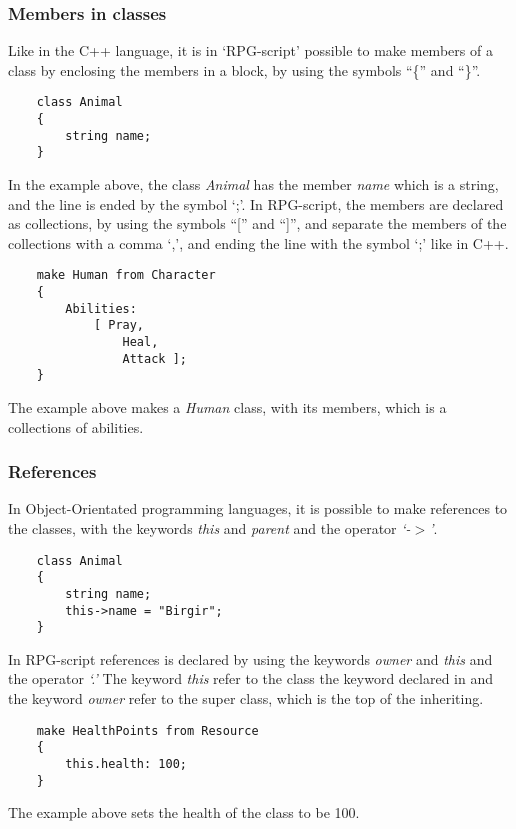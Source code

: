\subsubsection*{Members in classes}
Like in the C++ language, it is in `RPG-script' possible to make members of a class by enclosing the members in a block, by using the symbols ``\{'' and ``\}''.
\begin{lstlisting}
	class Animal
	{
		string name;
	}
\end{lstlisting}
In the example above, the class \emph{Animal} has the member \emph{name} which is a string, and the line is ended by the symbol `;'.
In RPG-script, the members are declared as collections, by using the symbols ``['' and ``]'', and separate the members of the collections with a comma `,', and ending the line with the symbol `;' like in C++.
\begin{lstlisting}
	make Human from Character
	{	
		Abilities:
			[ Pray, 
				Heal,
				Attack ];
	}
\end{lstlisting}
The example above makes a \emph{Human} class, with its members, which is a collections of abilities.

\subsubsection*{References}
In Object-Orientated programming languages, it is possible to make references to the classes, with the keywords \emph{this} and \emph{parent} and the operator \emph{`-$>$'}.
\begin{lstlisting}
	class Animal
	{
		string name;
		this->name = "Birgir";
	}
\end{lstlisting}
 In RPG-script references is declared by using the keywords \emph{owner} and \emph{this} and the operator \emph{`.'} The keyword \emph{this} refer to the class the keyword declared in and the keyword \emph{owner} refer to the super class, which is the top of the inheriting. 
\begin{lstlisting}
	make HealthPoints from Resource
	{
		this.health: 100;
	}
\end{lstlisting}
The example above sets the health of the class to be 100.